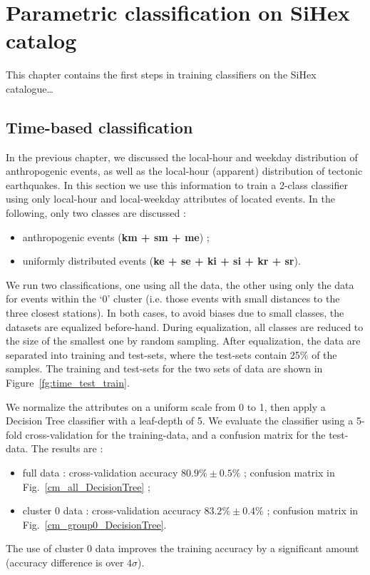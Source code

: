 \chapter{Parametric classification on SiHex catalog}
This chapter contains the first steps in training classifiers on the SiHex catalogue\ldots

\section{Time-based classification}
In the previous chapter, we discussed the local-hour and weekday distribution of anthropogenic events, as well as the local-hour (apparent) distribution of tectonic earthquakes. In this section we use this information to train a 2-class classifier using only local-hour and local-weekday attributes of located events. In the following, only two classes are discussed :
\begin{itemize}
\item anthropogenic events ({\bf km + sm + me}) ;
\item uniformly distributed events ({\bf ke + se + ki + si + kr + sr}).
\end{itemize}
We run two classifications, one using all the data, the other using only the data for events within the `0' cluster (i.e. those events with small distances to the three closest stations). In both cases, to avoid biases due to small classes, the datasets are equalized before-hand. During equalization, all classes are reduced to the size of the smallest one by random sampling. After equalization, the data are separated into training and test-sets, where the test-sets contain 25\% of the samples. The training and test-sets for the two sets of data are shown in Figure~\ref{fg:time_test_train}.

We normalize the attributes on a uniform scale from 0 to 1, then apply a Decision Tree classifier with a leaf-depth of 5. We evaluate the classifier using a 5-fold cross-validation for the training-data, and a confusion matrix for the test-data. The results are :
\begin{itemize}
\item full data : cross-validation accuracy $80.9\% \pm 0.5\%$ ; confusion matrix in Fig.~\ref{cm_all_DecisionTree} ;
\item cluster 0 data : cross-validation accuracy $83.2\% \pm 0.4\%$ ; confusion matrix in Fig.~\ref{cm_group0_DecisionTree}.
\end{itemize}
The use of cluster 0 data improves the training accuracy by a significant amount (accuracy difference is over $4\sigma$).

